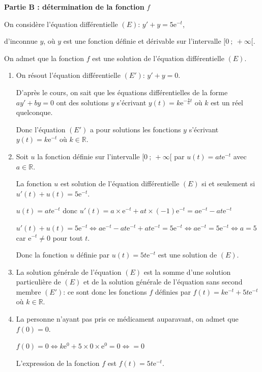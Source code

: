 \documentclass[10pt]{article}
\providecommand{\R}{\mathbb{R}}
\providecommand{\e}{{\mathrm{e}}}
\begin{document}
\medskip

\textbf{Partie B : détermination de la fonction} \boldmath $f$ \unboldmath

\medskip

On considère l'équation différentielle  $(E)$: $y' +y = 5\e^{-t}$,

d'inconnue $y$, où $y$ est une fonction définie et dérivable sur l'intervalle $[0~;~+ \infty[$.

On admet que la fonction $f$ est une solution de l'équation différentielle $(E)$.



\begin{enumerate}
\item On résout l'équation différentielle $(E')$: $y' + y = 0$.

D'après le cours, on sait que les équations différentielles de la forme $ay'+by=0$ ont des solutions $y$ s'écrivant $y(t) = k\e^{-\frac{b}{a}t}$ où $k$ est un réel quelconque.

Donc l'équation $(E')$ a pour solutions les fonctions $y$ s'écrivant $y(t)=k\e^{-t}$ où $k\in\R$.

\item Soit $u$ la fonction définie sur l'intervalle $[0~;~ +\infty[$ par $u(t) = at\e^{-t}$ avec $a \in \R$.



La fonction $u$ est solution de l'équation différentielle $(E)$ si et seulement si $u'(t)+u(t)=5\e^{-t}$.

$u(t)=at\e^{-t}$ donc $u'(t)= a\times \e^{-t} + at\times (-1)\e^{-t}= a\e^{-t}-at\e^{-t}$

$u'(t)+u(t)=5\e^{-t}
\iff a\e^{-t}-at\e^{-t} + at\e^{-t}=5\e^{-t}
\iff a\e^{-t}=5\e^{-t}
\iff a=5$ car $\e^{-t}\neq 0$ pour tout $t$.

Donc la fonction $u$ définie par $u(t)=5t\e^{-t}$ est une solution de $(E)$.

\item
La solution générale de l'équation $(E)$ est la somme d'une solution particulière de $(E)$ et de la solution générale de l'équation sans second membre $(E')$: ce sont donc les fonctions $f$ définies par $f(t)=k\e^{-t}+5t\e^{-t}$ où $k\in\R$.

\item La personne n'ayant pas pris ce médicament auparavant, on admet que $f(0) = 0$.



$f(0)=0 \iff k\e^{0}+5\times 0 \times \e^{0}=0 \iff = 0$

L'expression de la fonction $f$ est $f(t)=5t\e^{-t}$.

\end{enumerate}
\end{document}
